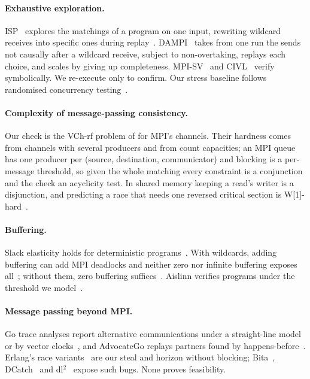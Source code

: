 \paragraph{Exhaustive exploration.} ISP~\citep{vakkalanka08isp} explores the matchings of a
program on one input, rewriting wildcard receives into specific ones during
replay~\citep{gopalakrishnan11cacm}. DAMPI~\citep{vo10dampi} takes from one run the sends not
causally after a wildcard receive, subject to non-overtaking, replays each choice, and
scales by giving up completeness. MPI-SV~\citep{yu20mpisv} and
CIVL~\citep{siegel15civl} verify symbolically. We re-execute only to confirm.
Our stress baseline follows
randomised concurrency testing~\citep{wolff24rff,zhao25surw}.

\paragraph{Complexity of message-passing consistency.} Our check is the VCh-rf problem
of \citet{shi26popl} for MPI's channels. Their hardness comes from channels with several
producers and from count capacities; an MPI queue has one producer per (source, destination,
communicator) and blocking is a
per-message threshold, so given the whole matching every constraint is a conjunction and the check
an acyclicity test. In shared memory keeping a read's writer is a disjunction, and predicting a
race that needs one reversed critical section is W[1]-hard~\citep{mathur21syncp}.

\paragraph{Buffering.} Slack elasticity holds for deterministic programs~\citep{manohar98slack}.
With wildcards, adding buffering can add MPI deadlocks and neither zero nor infinite buffering
exposes all~\citep{vakkalanka10slack}; without them, zero buffering
suffices~\citep{siegel05ppopp,siegel07europvm}. Aislinn verifies programs under the threshold we
model~\citep{bohm16aislinn}.

\paragraph{Message passing beyond MPI\@.} Go trace analyses report alternative communications
under a straight-line model~\citep{sulzmann17hvc} or by vector clocks~\citep{sulzmann18go}, and
AdvocateGo replays partners found by happens-before~\citep{advocatego}. Erlang's race
variants~\citep{vidal22racevariants} are our steal and horizon without blocking;
Bita~\citep{tasharofi13bita}, DCatch~\citep{liu17dcatch} and dl$^2$~\citep{gao25dl2} expose
such bugs. None proves feasibility.

